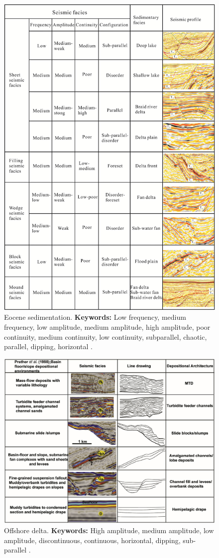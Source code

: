 \begin{figure}[h!]
    \centering
    \includegraphics[width=0.9\linewidth]{Figures/0.3Seismic/Chen2017_River_trace_1.png}
    \caption[Eocene sedimentation.]{Eocene sedimentation. \textbf{Keywords: } Low frequency, medium frequency, low amplitude, medium amplitude, high amplitude, poor continuity, medium continuity, low continuity, subparallel, chaotic, parallel, dipping, horizontal \citep{Chen2017}.}
    \label{fig:Chen2017-1}
\end{figure}

\begin{figure}[h!]
    \centering
    \includegraphics[width=0.75\linewidth]{Figures/0.3Seismic/Chima2019_Basin_trace_1.png}
    \caption[Offshore delta.]{Offshore delta. \textbf{Keywords: } High amplitude, medium amplitude, low amplitude, discontinuous, continuous, horizontal, dipping,  sub-parallel \citep{Chima2019}.}
    \label{fig:Chima2019-1}
\end{figure}

